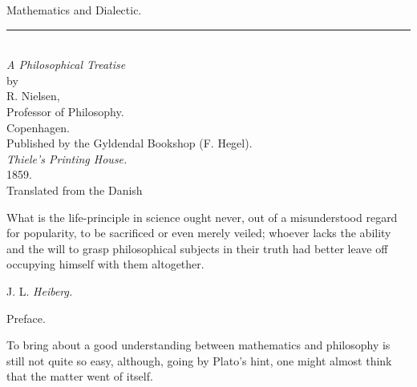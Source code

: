 \documentclass[12pt,a4paper,openany]{book}
\newcommand{\opage}[1]{\marginnote{\footnotesize\textit{[#1]}}}
\begin{document}
\begin{titlepage}
\begin{center}
\vspace*{3em}
{\Huge Mathematics and Dialectic.}\\[1em]
\rule{4em}{0.4pt}\\[1.5em]
{\large \emph{A Philosophical Treatise}}\\[1.5em]
by\\[1em]
{\large R. Nielsen,}\\[0.3em]
Professor of Philosophy.\\[4em]
{\large Copenhagen.}\\[0.5em]
Published by the Gyldendal Bookshop (F. Hegel).\\[0.5em]
{\small \emph{Thiele's Printing House.}}\\[0.5em]
1859.\\[4em]
{\small Translated from the Danish}
\end{center}
\end{titlepage}
\thispagestyle{empty}
\vspace*{14em}
{\small
\noindent What is the life-principle in science ought never, out of a misunderstood regard
for popularity, to be sacrificed or even merely veiled; whoever lacks the ability and
the will to grasp philosophical subjects in their truth had better leave off occupying
himself with them altogether.\par
\hfill J. L. \emph{Heiberg.}\par}
\clearpage

\begin{center}{\large Preface.}\end{center}

\opage{I}To bring about a good understanding between mathematics and
philosophy is still not quite so easy, although, going by
Plato's hint, one might almost think that the matter went of itself.
\end{document}
